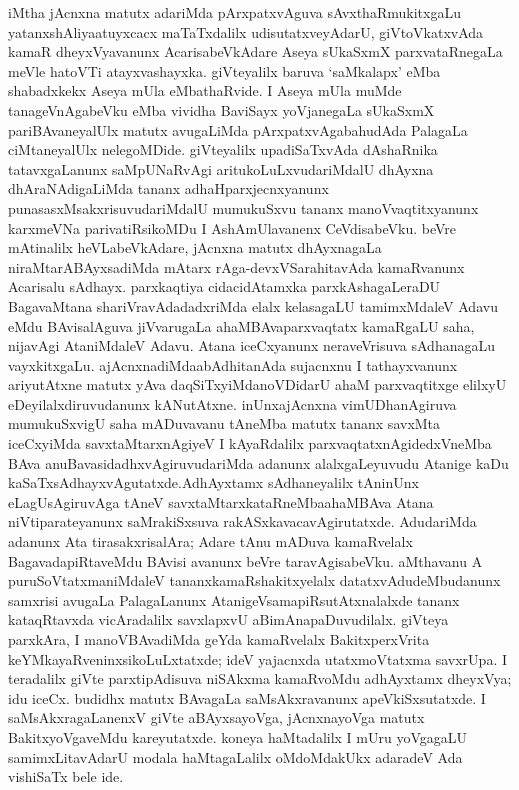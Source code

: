 iMtha jAcnxna matutx adariMda pArxpatxvAguva sAvxthaRmukitxgaLu yatanxshAliya\break atuyxcacx maTaTxdalilx udisutatxveyAdarU, giVtoVkatxvAda kamaR dheyxVyavanunx Acarisa\-beVkAdare Aseya sUkaSxmX parxvataRnegaLa meVle hatoVTi atayxvashayxka. giVteyalilx baruva `saMkalapx' eMba shabadxkekx Aseya mUla eMbathaRvide. I Aseya mUla muMde tanageV\-nAgabeVku eMba vividha BaviSayx yoVjanegaLa sUkaSxmX pariBAvaneyalUlx matutx avugaLiMda pArxpatxvAgabahudAda PalagaLa ciMtaneyalUlx nelegoMDide. giVteyalilx upadiSaTxvAda dAshaRnika tatavxgaLanunx saMpUNaRvAgi aritukoLuLxvudariMdalU dhAyxna dhAraNAdigaLiMda tananx adhaHparxjecnxyanunx punasasxMsakxrisuvudariMdalU mumukuSxvu tananx manoVvaqtitxyanunx karxmeVNa parivatiRsikoMDu I AshAmUlavanenx CeVdisabeVku. beVre mAtinalilx heVLabeVkAdare, jAcnxna matutx dhAyxnagaLa niraMtarABAyxsadiMda mAtarx rAga-devxVSarahitavAda kamaRvanunx Acarisalu sAdhayx. parxkaqtiya cidacidAtamxka parxkAsha\-gaLeraDU BagavaMtana shariVravAdadadxriMda elalx kelasagaLU tamimxMdaleV Adavu eMdu BAvisalAguva jiVvarugaLa ahaMBAvaparxvaqtatx kamaRgaLU saha, nijavAgi Ata\-niMdaleV Adavu. Atana iceCxyanunx neraveVrisuva sAdhanagaLu vayxkitxgaLu. ajAcnxnadiMda\break abAdhitanAda sujacnxnu I tathayxvanunx ariyutAtxne matutx yAva daqSiTxyiMda\break noVDidarU ahaM parxvaqtitxge elilxyU eDeyilalxdiruvudanunx kANutAtxne. inUnx\break  ajAcnxna vimUDhanAgiruva mumukuSxvigU saha mADuvavanu tAneMba matutx tananx savxMta iceCxyiMda savxtaMtarxnAgiyeV I kAyaRdalilx parxvaqtatxnAgidedxVneMba BAva anuBava\-sidadhxvAgiruvudariMda adanunx alalxgaLeyuvudu Atanige kaDu kaSaTxsAdhayxvAgutatxde.\break AdhAyxtamx sAdhaneyalilx tAninUnx eLagUsAgiruvAga tAneV savxtaMtarxkataRneMba\break ahaMBAva Atana niVtiparateyanunx saMrakiSxsuva rakASxkavacavAgirutatxde. AdudariMda adanunx Ata tirasakxrisalAra; Adare tAnu mADuva kamaRvelalx BagavadapiRtaveMdu BAvisi avanunx beVre taravAgisabeVku. aMthavanu A puruSoVtatxmaniMdaleV tananx\break kamaRshakitxyelalx datatxvAdudeMbudanunx samxrisi avugaLa PalagaLanunx AtanigeV\break samapiRsutAtxnalalxde tananx kataqRtavxda vicAradalilx savxlapxvU aBimAnapaDuvudilalx. giVteya parxkAra, I manoVBAvadiMda geYda kamaRvelalx BakitxperxVrita keYMkayaRveninxsikoLuLx\-tatxde; ideV yajacnxda utatxmoVtatxma savxrUpa. I teradalilx giVte parxtipAdisuva niSAkxma kamaR\-voMdu adhAyxtamx dheyxVya; idu iceCx. budidhx matutx BAvagaLa saMsAkxravanunx apeVkiSx\-sutatxde. I saMsAkxragaLanenxV giVte aBAyxsayoVga, jAcnxnayoVga matutx BakitxyoVgaveMdu kareyutatxde. koneya haMtadalilx I mUru yoVgagaLU samimxLitavAdarU modala haMtagaLalilx oMdoMdakUkx adaradeV Ada vishiSaTx bele ide.

